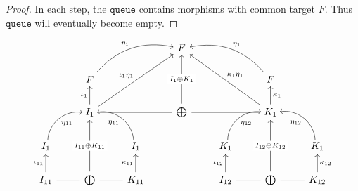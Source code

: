 \begin{proof}
In each step, the $\mathtt{queue}$ contains morphisms with common target $F$. 
Thus $\mathtt{queue}$ will eventually become empty.

\end{proof}


\[
\begin{tikzcd}
                                                          &                                                                                   &                                                          & F                                                      &                                                           &                                                                                       &                                                          \\
                                                          & F \arrow[rru, "\eta_{1}", bend left]                                              &                                                          &                                                        &                                                           & F \arrow[llu, "\eta_{1}"', bend right]                                                &                                                          \\
                                                          & I_{1} \arrow[u, "\iota_{1}"] \arrow[rr, dash] \arrow[rruu, "\iota_{1}\eta_{1}"] &                                                          & \bigoplus \arrow[uu, "I_{1} \oplus K_{1}" description] &                                                           & K_{1} \arrow[u, "\kappa_{1}"'] \arrow[ll, dash] \arrow[lluu, "\kappa_{1}\eta_{1}"'] &                                                          \\
I_{1} \arrow[ru, "\eta_{11}"', bend left=49, shift right] &                                                                                   & I_{1} \arrow[lu, "\eta_{11}", bend right=49, shift left] &                                                        & K_{1} \arrow[ru, "\eta_{12}"', bend left=49, shift right] &                                                                                       & K_{1} \arrow[lu, "\eta_{12}", bend right=49, shift left] \\
I_{11} \arrow[u, "\iota_{11}"] \arrow[r, dash]          & \bigoplus \arrow[uu, "I_{11}\oplus K_{11}" description]                           & K_{11} \arrow[u, "\kappa_{11}"] \arrow[l, dash]        &                                                        & I_{12} \arrow[u, "\iota_{12}"] \arrow[r, dash]          & \bigoplus \arrow[uu, "I_{12} \oplus K_{12}" description]                              & K_{12} \arrow[u, "\kappa_{12}"'] \arrow[l, dash]      
\end{tikzcd}
\]




